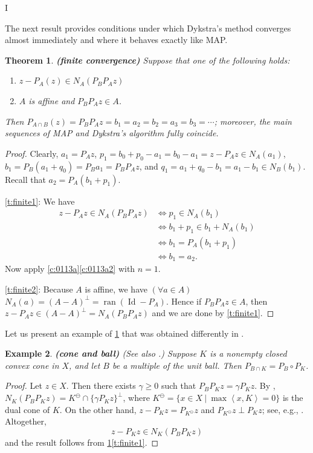 I\documentclass[12pt]{article}
\newcommand{\menge}[2]{\big\{{#1}~\big |~{#2}\big\}}
\newcommand{\scal}[2]{\left\langle{#1},{#2}  \right\rangle}
\newcommand{\ran}{\ensuremath{\operatorname{ran}}}
\newcommand{\Id}{\ensuremath{\operatorname{Id}}}
\newtheorem{theorem}{Theorem}[section]
\newtheorem{example}[theorem]{Example}
\providecommand{\ran}{\operatorname{ran}}
\providecommand{\Id}{\operatorname{{ Id}}}
\providecommand{\ran}{\operatorname{ran}}
\providecommand{\Id}{\operatorname{Id}}
\begin{document}
The next result provides conditions under which Dykstra's method 
converges almost immediately and where it behaves exactly like MAP. 

\begin{theorem} {\rm\bf (finite convergence)}
\label{t:finite}
Suppose that one of the following holds:
\begin{enumerate}
\item 
\label{t:finite1}
$z-P_A(z)\in N_A(P_BP_Az)$
\item 
\label{t:finite2}
$A$ is affine and $P_BP_Az\in A$.
\end{enumerate}
Then 
$P_{A\cap B}(z)=P_BP_Az = b_1=a_2=b_2=a_3=b_3=\cdots$;
moreover, the main sequences of MAP and Dykstra's algorithm fully coincide. 
\end{theorem}
\begin{proof}
Clearly, $a_1=P_Az$, 
$p_1 = b_0+p_0-a_1 = b_0-a_1 = z-P_Az\in N_A(a_1)$,
$b_1 = P_B(a_1+q_0)=P_Ba_1 = P_BP_Az$, and
$q_1 = a_1+q_0-b_1 = a_1-b_1 \in N_B(b_1)$.
Recall that $a_2=P_A(b_1+p_1)$.

\cref{t:finite1}:
We have 
\begin{subequations}
\begin{align}
z-P_Az\in N_A(P_BP_Az)
&\Leftrightarrow 
p_1 \in N_A(b_1)\\
&\Leftrightarrow 
b_1+p_1\in b_1+N_A(b_1)\\
&\Leftrightarrow 
b_1 = P_A(b_1+p_1)\\
&\Leftrightarrow 
b_1 = a_2.
\end{align}
\end{subequations}
Now apply \cref{c:0113a}\cref{c:0113a2} with $n=1$.

\cref{t:finite2}:
Because $A$ is affine, we have 
$(\forall a\in A)$ $N_A(a) = (A-A)^\perp = \ran(\Id-P_A)$.
Hence 
if $P_BP_Az\in A$, then 
$z-P_Az \in (A-A)^\perp = N_A(P_BP_Az)$
and we are done by \cref{t:finite1}.
\end{proof}

Let us present an example of \cref{t:finite} that was obtained differently 
in \cite{Minh}. 

\begin{example} 
{\rm\bf (cone and ball)}
 (See also \cite[Corollary~7.3]{Minh}.)
\label{ex:Minh}
Suppose $K$ is a nonempty closed convex cone in $X$,
and let $B$ be a multiple of the unit ball.
Then $P_{B\cap K} = P_B\circ P_K$.
\end{example}
\begin{proof}
Let $z\in X$. 
Then there exists $\gamma\geq 0$ such that
$P_BP_Kz = \gamma P_Kz$.
By \cite[Example~6~40]{BC2017},
$N_K(P_BP_Kz) = K^\ominus \cap \{\gamma P_Kz\}^\perp$, 
where $K^\ominus = \menge{x\in X}{\max\scal{x}{K}=0}$ is the dual cone of $K$. 
On the other hand,
$z-P_Kz = P_{K^\ominus}z$ and
$P_{K^\ominus}z \perp P_Kz$; see, e.g., \cite[Theorem~6.30]{BC2017}.
Altogether,
\begin{equation}
 z-P_Kz \in N_K(P_BP_Kz)
\end{equation}
and the result follows from \cref{t:finite}\cref{t:finite1}.
\end{proof}
\end{document}
